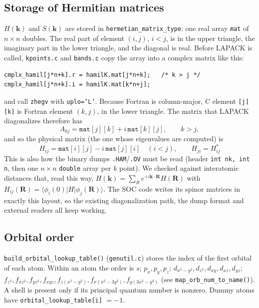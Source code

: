 \documentclass[11pt,a4paper]{article}
\newcommand{\file}[1]{\texttt{#1}}
\newcommand{\fn}[1]{\texttt{#1()}}
\newcommand{\var}[1]{\texttt{#1}}
\begin{document}
\subsection{Storage of Hermitian matrices}\label{sec:packed}

$H(\mathbf{k})$ and $S(\mathbf{k})$ are stored in \var{hermetian\_matrix\_type}: one real
array \var{mat} of $n\times n$ doubles. The real part of element $(i,j)$, $i<j$, is in the
upper triangle, the imaginary part in the lower triangle, and the diagonal is real. Before
LAPACK is called, \file{kpoints.c} and \file{bands.c} copy the array into a complex matrix
like this:
\begin{lstlisting}
cmplx_hamil[j*n+k].r = hamilK.mat[j*n+k];   /* k > j */
cmplx_hamil[j*n+k].i = hamilK.mat[k*n+j];
\end{lstlisting}
and call \texttt{zhegv} with \texttt{uplo='L'}. Because Fortran is column-major, C element
\texttt{[j][k]} is Fortran element $(k,j)$, in the lower triangle. The matrix that LAPACK
diagonalizes therefore has
\begin{equation}
A_{kj} = \texttt{mat}[j][k] + i\,\texttt{mat}[k][j], \qquad k>j ,
\end{equation}
and so the physical matrix (the one whose eigenvalues are computed) is
\begin{equation}\label{eq:packed}
\boxed{\;H_{ij} = \texttt{mat}[i][j] - i\,\texttt{mat}[j][i]\quad (i<j),\qquad H_{ji}=H_{ij}^{*}\;}
\end{equation}
This is also how the binary dumps \texttt{.HAM}/\texttt{.OV} must be read (header
\texttt{int nk, int n}, then one $n\times n$ \texttt{double} array per $k$ point). We
checked against interatomic distances that, read this way, $H(\mathbf{k})=\sum_R
e^{+i\mathbf{k}\cdot\mathbf{R}}H(\mathbf{R})$ with $H_{ij}(\mathbf{R})=\langle\phi_i(0)|H|\phi_j(\mathbf{R})\rangle$.
The SOC code writes its spinor matrices in exactly this layout, so the existing
diagonalization path, the dump format and external readers all keep working.

\subsection{Orbital order}

\fn{build\_orbital\_lookup\_table} (\file{genutil.c}) stores the index of the first
orbital of each atom. Within an atom the order is $s$; $p_x,p_y,p_z$;
$d_{x^2-y^2}, d_{z^2}, d_{xy}, d_{xz}, d_{yz}$; $f_{z^3}, f_{xz^2}, f_{yz^2}, f_{xyz},
f_{z(x^2-y^2)}, f_{x(x^2-3y^2)}, f_{y(3x^2-y^2)}$ (see \fn{map\_orb\_num\_to\_name}).
A shell is present only if its principal quantum number is nonzero. Dummy atoms have
\var{orbital\_lookup\_table[i]} $=-1$.
\end{document}
